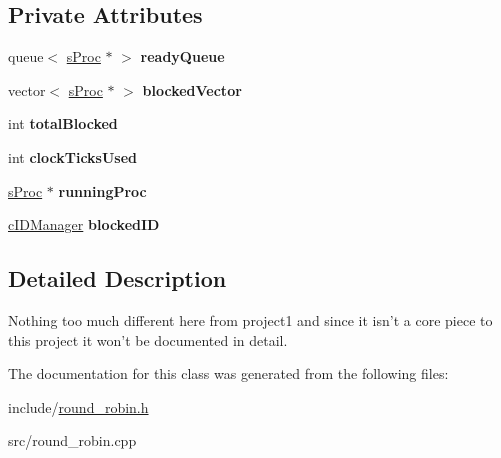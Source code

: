 \subsection*{\-Private \-Attributes}
\begin{DoxyCompactItemize}
\item 
\hypertarget{classcRoundRobin_a36b3b12e175d93e4a1a23734ec0b0484}{queue$<$ \hyperlink{structsProc}{s\-Proc} $\ast$ $>$ {\bfseries ready\-Queue}}\label{dc/dcc/classcRoundRobin_a36b3b12e175d93e4a1a23734ec0b0484}

\item 
\hypertarget{classcRoundRobin_a1bba76fc4540d29a8de4c29cfccc67f9}{vector$<$ \hyperlink{structsProc}{s\-Proc} $\ast$ $>$ {\bfseries blocked\-Vector}}\label{dc/dcc/classcRoundRobin_a1bba76fc4540d29a8de4c29cfccc67f9}

\item 
\hypertarget{classcRoundRobin_a2068152f0b3d1592dc031ecf7b0d7d5f}{int {\bfseries total\-Blocked}}\label{dc/dcc/classcRoundRobin_a2068152f0b3d1592dc031ecf7b0d7d5f}

\item 
\hypertarget{classcRoundRobin_a8779f8cb28be168316b485c77d09b210}{int {\bfseries clock\-Ticks\-Used}}\label{dc/dcc/classcRoundRobin_a8779f8cb28be168316b485c77d09b210}

\item 
\hypertarget{classcRoundRobin_a8f0f882cea2c2d2289aef7b320ff15be}{\hyperlink{structsProc}{s\-Proc} $\ast$ {\bfseries running\-Proc}}\label{dc/dcc/classcRoundRobin_a8f0f882cea2c2d2289aef7b320ff15be}

\item 
\hypertarget{classcRoundRobin_a15ca5ec15a4ae935706b55ac71d6bee2}{\hyperlink{classcIDManager}{c\-I\-D\-Manager} {\bfseries blocked\-I\-D}}\label{dc/dcc/classcRoundRobin_a15ca5ec15a4ae935706b55ac71d6bee2}

\end{DoxyCompactItemize}


\subsection{\-Detailed \-Description}
\-Nothing too much different here from project1 and since it isn't a core piece to this project it won't be documented in detail. 

\-The documentation for this class was generated from the following files\-:\begin{DoxyCompactItemize}
\item 
include/\hyperlink{round__robin_8h}{round\-\_\-robin.\-h}\item 
src/round\-\_\-robin.\-cpp\end{DoxyCompactItemize}
